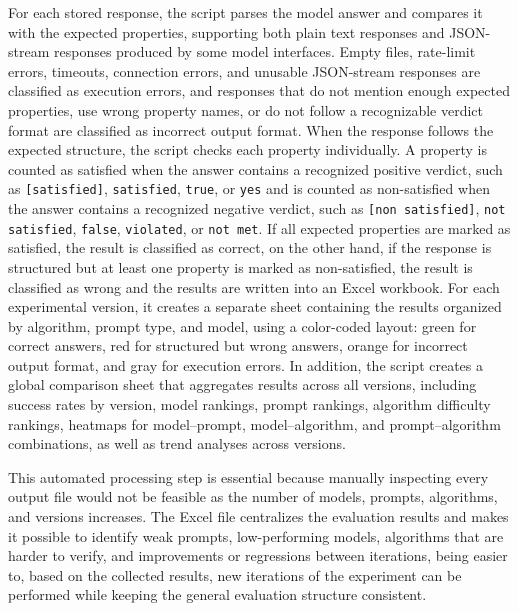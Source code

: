 For each stored response, the script parses the model answer and compares it with the expected properties, supporting both plain text responses and JSON-stream responses produced by some model interfaces. Empty files, rate-limit errors, timeouts, connection errors, and unusable JSON-stream responses are classified as execution errors, and responses that do not mention enough expected properties, use wrong property names, or do not follow a recognizable verdict format are classified as incorrect output format. When the response follows the expected structure, the script checks each property individually. A property is counted as satisfied when the answer contains a recognized positive verdict, such as \texttt{[satisfied]}, \texttt{satisfied}, \texttt{true}, or \texttt{yes} and is counted as non-satisfied when the answer contains a recognized negative verdict, such as \texttt{[non satisfied]}, \texttt{not satisfied}, \texttt{false}, \texttt{violated}, or \texttt{not met}. If all expected properties are marked as satisfied, the result is classified as correct, on the other hand, if the response is structured but at least one property is marked as non-satisfied, the result is classified as wrong and the results are written into an Excel workbook. For each experimental version, it creates a separate sheet containing the results organized by algorithm, prompt type, and model, using a color-coded layout: green for correct answers, red for structured but wrong answers, orange for incorrect output format, and gray for execution errors. In addition, the script creates a global comparison sheet that aggregates results across all versions, including success rates by version, model rankings, prompt rankings, algorithm difficulty rankings, heatmaps for model--prompt, model--algorithm, and prompt--algorithm combinations, as well as trend analyses across versions.

This automated processing step is essential because manually inspecting every output file would not be feasible as the number of models, prompts, algorithms, and versions increases. The Excel file centralizes the evaluation results and makes it possible to identify weak prompts, low-performing models, algorithms that are harder to verify, and improvements or regressions between iterations, being easier to, based on the collected results, new iterations of the experiment can be performed while keeping the general evaluation structure consistent.

